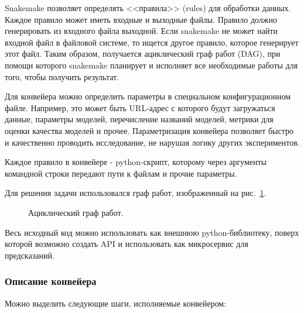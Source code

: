 \documentclass[a4paper,article,14pt]{extarticle}
\begin{document}
Snakemake позволяет определять <<правила>> (rules) для обработки данных.
Каждое правило может иметь входные и выходные файлы.
Правило должно генерировать из входного файла выходной.
Если snakemake не может найти входной файл в файловой системе, то ищется другое правило, которое генерирует этот файл.
Таким образом, получается ациклический граф работ (DAG), при помощи которого snakemake планирует и исполняет все необходимые работы для того, чтобы получить результат.
\par

Для конвейера можно определить параметры в специальном конфигурационном файле.
Например, это может быть URL-адрес с которого будут загружаться данные, параметры моделей, перечисление названий моделей, метрики для оценки качества моделей и прочее.
Параметризация конвейера позволяет быстро и качественно проводить исследование, не нарушая логику других экспериментов.
\par

Каждое правило в конвейере - python-скрипт, которому через аргументы командной строки передают пути к файлам и прочие параметры.
\par
Для решения задачи использовался граф работ, изображенный на рис.~\ref{graph_dag}.
\begin{figure}[ht]
    \begin{center}
        \caption{
            \label{graph_dag}
                 Ациклический граф работ.
        }
    \end {center}
\end {figure}

\par
Весь исходный код можно использовать как внешнюю python-библиотеку, поверх которой возможно создать API и использовать как микросервис для предсказаний.

\subsubsection{Описание конвейера}
Можно выделить следующие шаги, исполняемые конвейером:
\end{document}

